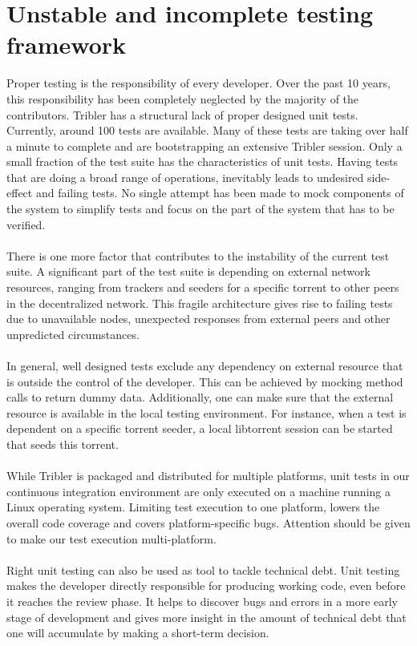 \section{Unstable and incomplete testing framework}
Proper testing is the responsibility of every developer. Over the past 10 years, this responsibility has been completely neglected by the majority of the contributors. Tribler has a structural lack of proper designed unit tests. Currently, around 100 tests are available. Many of these tests are taking over half a minute to complete and are bootstrapping an extensive Tribler session. Only a small fraction of the test suite has the characteristics of unit tests. Having tests that are doing a broad range of operations, inevitably leads to undesired side-effect and failing tests. No single attempt has been made to mock components of the system to simplify tests and focus on the part of the system that has to be verified.\\\\
There is one more factor that contributes to the instability of the current test suite. A significant part of the test suite is depending on external network resources, ranging from trackers and seeders for a specific torrent to other peers in the decentralized network. This fragile architecture gives rise to failing tests due to unavailable nodes, unexpected responses from external peers and other unpredicted circumstances.\\\\
In general, well designed tests exclude any dependency on external resource that is outside the control of the developer. This can be achieved by mocking method calls to return dummy data. Additionally, one can make sure that the external resource is available in the local testing environment. For instance, when a test is dependent on a specific torrent seeder, a local libtorrent session can be started that seeds this torrent.\\\\
While Tribler is packaged and distributed for multiple platforms, unit tests in our continuous integration environment are only executed on a machine running a Linux operating system. Limiting test execution to one platform, lowers the overall code coverage and covers platform-specific bugs. Attention should be given to make our test execution multi-platform.\\\\
Right unit testing can also be used as tool to tackle technical debt. Unit testing makes the developer directly responsible for producing working code, even before it reaches the review phase. It helps to discover bugs and errors in a more early stage of development and gives more insight in the amount of technical debt that one will accumulate by making a short-term decision. %

